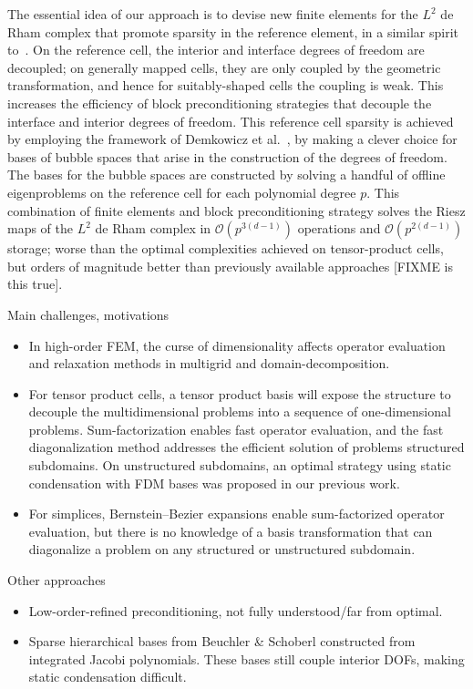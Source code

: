 \documentclass[review,onefignum,onetabnum,a4paper]{siamart190516}
\begin{document}
The essential idea of our approach is to devise new finite elements for the $L^2$ de Rham complex that promote sparsity in the reference
element, in a similar spirit to~\cite{brubeck24}. On the reference cell, the interior and interface degrees of freedom are decoupled; on generally mapped cells, they are only coupled by the geometric transformation, and hence for suitably-shaped cells the coupling is weak. This increases the efficiency of block preconditioning strategies that decouple the interface and interior degrees of freedom. This reference cell sparsity is achieved by employing the framework of Demkowicz et al.~\cite{demkowicz00}, by making a clever choice for bases of bubble spaces that arise in the construction of the degrees of freedom. The bases for the bubble spaces are constructed by solving a handful of offline eigenproblems on the reference cell for each polynomial degree $p$. This combination of finite elements and block preconditioning strategy solves the Riesz maps of the $L^2$ de Rham complex in $\mathcal{O}(p^{3(d-1)})$ operations and $\mathcal{O}(p^{2(d-1)})$ storage; worse than the optimal complexities achieved on tensor-product cells, but orders of magnitude better than previously available approaches [FIXME is this true].

Main challenges, motivations
\begin{itemize}
\item In high-order FEM, the curse of dimensionality affects operator
   evaluation and relaxation methods in multigrid and domain-decomposition.  
\item For tensor product cells,
   a tensor product basis will expose the structure to decouple the
   multidimensional problems into a sequence of one-dimensional problems.
   Sum-factorization enables fast operator evaluation, and the fast
   diagonalization method addresses the efficient solution of problems
   structured subdomains.  On unstructured subdomains, an optimal strategy
   using static condensation with FDM bases was proposed in our previous
   work.
\item For simplices, Bernstein--Bezier expansions enable sum-factorized
   operator evaluation, but there is no knowledge of a basis transformation
   that can diagonalize a problem on any structured or unstructured subdomain.
\end{itemize}


Other approaches
\begin{itemize}
\item Low-order-refined preconditioning, not fully understood/far from optimal.
\item Sparse hierarchical bases from Beuchler \& Schoberl constructed from integrated Jacobi polynomials. 
   These bases still couple interior DOFs, making static condensation difficult.
\end{itemize}
\end{document}
